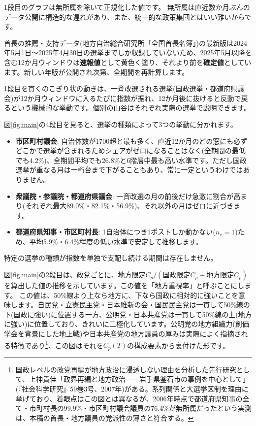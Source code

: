 \documentclass[a4paper,11pt]{ltjsarticle}
\begin{document}
1段目のグラフは無所属を除いて正規化した値です。
無所属は直近数か月ぶんのデータ公開に構造的な遅れがあり、また、統一的な政策集団とはいい難いからです。

首長の推薦・支持データ(地方自治総合研究所「全国首長名簿」)の最新版は2024年5月1日〜2025年4月30日の選挙までしか収録していないため、2025年5月以降を含む12か月ウィンドウは\textbf{速報値}として黄色く塗り、それより前を\textbf{確定値}としています。新しい年版が公開され次第、全期間を再計算します。

1段目を貫くのこぎり状の動きは、一斉改選される選挙(国政選挙・都道府県議会)が12か月ウィンドウに入るたびに指数が振れ、12か月後に抜けると反動で戻るという機械的な挙動です。個別の山谷はそれぞれ実際の選挙で説明できます。

図\ref{fig:main}の4段目を見ると、選挙の種類によって3つの挙動に分かれます。

\begin{itemize}
\item \textbf{市区町村議会}: 自治体数が1700超と最も多く、直近12か月のどの窓にも必ずどこかで選挙が含まれるためシェアがゼロになることはなく(全期間の最低でも4.2\%)、全期間平均でも26.8\%と6階層中最も高い水準です。ただし国政選挙が重なる月は一桁台まで下がることもあり、常に一定というわけではありません。
\item \textbf{衆議院・参議院・都道府県議会}: 一斉改選の月の前後だけ急激に割合が高まり(それぞれ最大89.0\%・82.1\%・56.9\%)、それ以外の月はゼロに近づきます。
\item \textbf{都道府県知事・市区町村長}: 1自治体につき1ポストしか動かない($n_e=1$)ため、平均5.9\%・6.4\%程度の低い水準で安定して推移します。
\end{itemize}

特定の選挙の種類が指数を単独で支配し続ける期間は存在しません。

図\ref{fig:main}の2段目は、政党ごとに、$\text{地方限定}C_p/(\text{国政限定}C_p+\text{地方限定}C_p)$を算出した値の推移を示しています。この値を「地方重視率」と呼ぶことにします。
この値は、50\%線より上なら地方に、下なら国政に相対的に強いことを意味します。自民党・立憲民主党・日本維新の会・国民民主党は一貫して50\%線の下(国政に強い)に位置する一方、公明党・日本共産党は一貫して50\%線の上(地方に強い)に位置しており、きれいに二極化しています。公明党の地方組織力(創価学会を背景にした地上戦)や日本共産党の地方議員の厚みは実際によく指摘される特徴であり\footnote{国政レベルの政党再編が地方政治に浸透しない理由を分析した先行研究として、上神貴佳「政界再編と地方政治――岩手県釜石市の事例を中心として」(『社会科学研究』59巻3号、2007年)がある。系列関係と大選挙区制を理由に挙げており、着眼点はこの図とは異なるが、2006年時点で都道府県知事の全て・市町村長の99.9\%・市区町村議会議員の76.4\%が無所属だったという実測は、本稿の首長・地方議員の党派性の薄さと符合する。}、この図はそれを$C_p(T)$の構成要素から裏付けた形です。
\end{document}
